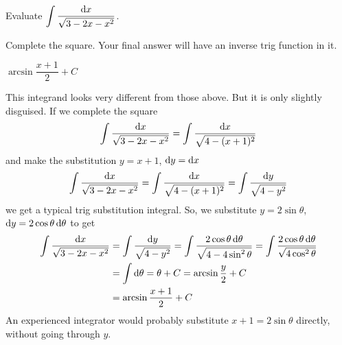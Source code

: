 \begin{Mquestion}[M105 2014A]
Evaluate $\displaystyle\int \frac{\mathrm{d}x}{\sqrt{3-2x-x^2}}$.
\end{Mquestion}

\begin{hint}
Complete the square. Your final answer will have an inverse trig function in it.
\end{hint}

\begin{answer}
$\arcsin\dfrac{x+1}{2} + C$
\end{answer}

\begin{solution}
This integrand looks very different from those above. But it is
only slightly disguised. If we complete the square
\begin{align*}
\int \frac{\mathrm{d}x}{\sqrt{3-2x-x^2}}
  = \int \frac{\mathrm{d}x}{\sqrt{4-(x+1)^2}}
\end{align*}
and make the substitution $y=x+1$, $\mathrm{d}y=\mathrm{d}x$
\begin{align*}
\int \frac{\mathrm{d}x}{\sqrt{3-2x-x^2}}
  = \int \frac{\mathrm{d}x}{\sqrt{4-(x+1)^2}}
  = \int \frac{\mathrm{d}y}{\sqrt{4-y^2}}
\end{align*}
we get a typical trig substitution integral. So, we substitute
$y=2\sin\theta$, $\mathrm{d}y=2\cos\theta\,\mathrm{d}\theta$ to get
\begin{align*}
\int \frac{\mathrm{d}x}{\sqrt{3-2x-x^2}}
&= \int \frac{\mathrm{d}y}{\sqrt{4-y^2}}
  = \int\frac{2\cos\theta\,\mathrm{d}\theta}{\sqrt{4-4\sin^2\theta}}
  = \int\frac{2\cos\theta\,\mathrm{d}\theta}{\sqrt{4\cos^2\theta}}\\
  &=\int\mathrm{d}\theta
  =\theta +C
  =\arcsin\frac{y}{2} + C \\
&=\arcsin\frac{x+1}{2} + C
\end{align*}
An experienced integrator would probably substitute $x+1 = 2\sin\theta$
directly, without going through $y$.


\end{solution}

